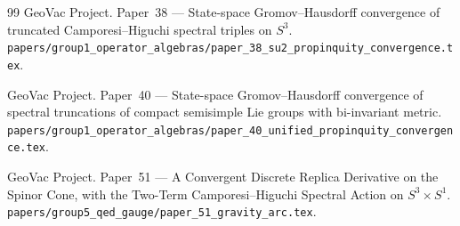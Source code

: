 \documentclass[11pt,a4paper]{article}
\theoremstyle{plain}
\theoremstyle{definition}
\begin{document}
\begin{thebibliography}{99}
GeoVac Project. Paper~38 --- State-space Gromov--Hausdorff convergence
of truncated Camporesi--Higuchi spectral triples on $S^3$.
\texttt{papers/group1\_operator\_algebras/paper\_38\_su2\_propinquity\_convergence.tex}.

GeoVac Project. Paper~40 --- State-space Gromov--Hausdorff convergence of
spectral truncations of compact semisimple Lie groups with bi-invariant metric.
\texttt{papers/group1\_operator\_algebras/paper\_40\_unified\_propinquity\_convergence.tex}.

GeoVac Project. Paper~51 --- A Convergent Discrete Replica Derivative on
the Spinor Cone, with the Two-Term Camporesi--Higuchi Spectral Action on
$S^3 \times S^1$.
\texttt{papers/group5\_qed\_gauge/paper\_51\_gravity\_arc.tex}.

\end{thebibliography}
\end{document}
